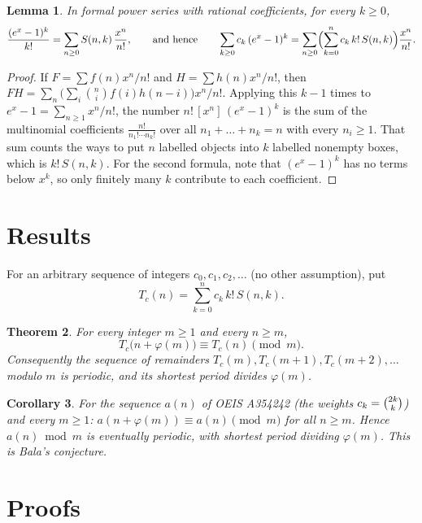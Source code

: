 \documentclass[11pt,a4paper]{article}
\newtheorem{theorem}{Theorem}[section]
\newtheorem{lemma}[theorem]{Lemma}
\newtheorem{corollary}[theorem]{Corollary}
\theoremstyle{definition}
\theoremstyle{remark}
\newcommand{\coeff}[2]{[x^{#1}]\,#2}
\begin{document}
\begin{lemma}\label{lem:egf}
In formal power series with rational coefficients, for every $k\ge0$,
\[
\frac{(e^x-1)^k}{k!}=\sum_{n\ge0}S(n,k)\,\frac{x^n}{n!},
\qquad\text{and hence}\qquad
\sum_{k\ge0}c_k\,(e^x-1)^k=\sum_{n\ge0}\Bigl(\sum_{k=0}^nc_k\,k!\,S(n,k)\Bigr)\frac{x^n}{n!}.
\]
\end{lemma}

\begin{proof}
If $F=\sum f(n)x^n/n!$ and $H=\sum h(n)x^n/n!$, then $FH=\sum_n\bigl(\sum_i\binom ni f(i)h(n-i)\bigr)x^n/n!$. Applying this
$k-1$ times to $e^x-1=\sum_{n\ge1}x^n/n!$, the number $n!\,\coeff{n}{(e^x-1)^k}$ is the sum of the multinomial coefficients
$\frac{n!}{n_1!\cdots n_k!}$ over all $n_1+\dots+n_k=n$ with every $n_i\ge1$. That sum counts the ways to put $n$ labelled
objects into $k$ labelled nonempty boxes, which is $k!\,S(n,k)$. For the second formula, note that $(e^x-1)^k$ has no
terms below $x^k$, so only finitely many $k$ contribute to each coefficient.
\end{proof}


\section{Results}\label{sec:results}

For an arbitrary sequence of integers $c_0,c_1,c_2,\dots$ (no other assumption), put
\begin{equation}\label{eq:transform}
T_c(n)=\sum_{k=0}^{n}c_k\,k!\,S(n,k).
\end{equation}

\begin{theorem}\label{thm:main}
For every integer $m\ge1$ and every $n\ge m$,
\[
T_c\bigl(n+\varphi(m)\bigr)\equiv T_c(n)\pmod m .
\]
Consequently the sequence of remainders $T_c(m),T_c(m+1),T_c(m+2),\dots$ modulo $m$ is periodic, and its shortest period
divides $\varphi(m)$.
\end{theorem}

\begin{corollary}\label{cor:seq}
For the sequence $a(n)$ of OEIS A354242 (the weights $c_k=\tbinom{2k}{k}$) and every $m\ge1$:
$a(n+\varphi(m))\equiv a(n)\pmod m$ for all $n\ge m$. Hence $a(n)\bmod m$ is eventually periodic, with shortest period
dividing $\varphi(m)$. This is Bala's conjecture.
\end{corollary}

\section{Proofs}\label{sec:proofs}
\end{document}
